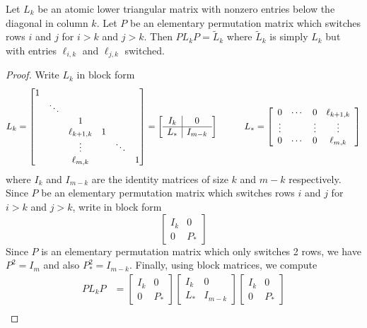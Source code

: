 \begin{proposition}
Let $L_k$ be an atomic lower triangular matrix with nonzero entries below the diagonal in column $k$. Let $P$ be an elementary permutation matrix which switches rows $i$ and $j$ for $i>k$ and $j>k$. Then $P L_k P = \tilde{L}_k$ where $\tilde{L}_k$ is simply $L_k$ but with entries $\ell_{i,k}$ and $\ell_{j,k}$ switched.

\begin{proof}
Write 
$L_k$ in block form
$$
L_k =
\begin{bmatrix}
1 & & & & & \\
& \ddots & & & & \\
& & 1 & & & \\
& & \ell_{k+1,k}& 1 & & \\
& & \vdots & & \ddots & \\
& & \ell_{m,k} & & & 1 \\
\end{bmatrix}
=
\left[ \begin{array}{c|c} I_k & 0 \\ \hline L_* & I_{m-k} \end{array} \right]
\hspace{10mm}
L_* = \left[ \begin{array}{cccc}
0 & \cdots & 0 & \ell_{k+1,k} \\
\vdots & & \vdots & \vdots \\
0 & \cdots & 0 & \ell_{m,k}
\end{array} \right]
$$
where $I_k$ and $I_{m-k}$ are the identity matrices of size $k$ and $m-k$ respectively. Since $P$ be an elementary permutation matrix which switches rows $i$ and $j$ for $i>k$ and $j>k$, write in block form
$$
\left[ \begin{array}{c|c} I_k & 0 \\ \hline 0 & P_* \end{array} \right]
$$
Since $P$ is an elementary permutation matrix which only switches 2 rows, we have $P^2 = I_m$ and also $P_*^2 = I_{m-k}$. Finally, using block matrices, we compute
\begin{align*}
P L_k P
&=
\left[ \begin{array}{c|c} I_k & 0 \\ \hline 0 & P_* \end{array} \right]
\left[ \begin{array}{c|c} I_k & 0 \\ \hline L_* & I_{m-k} \end{array} \right]
\left[ \begin{array}{c|c} I_k & 0 \\ \hline 0 & P_* \end{array} \right] \\

\end{align*}
\end{proof}
\end{proposition}
